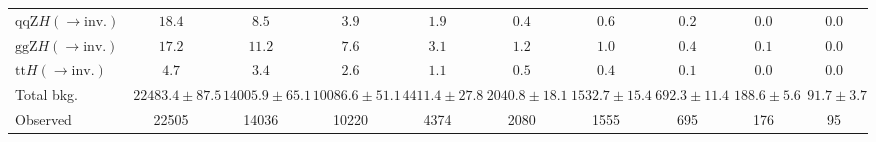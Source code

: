 \begin{tabular}{l|c|c|c|c|c|c|c|c|c}
$\mathrm{qqZ}H(\rightarrow \mathrm{inv.})$  & $18.4 $ & $8.5 $ & $3.9 $ & $1.9 $ & $0.4 $ & $0.6 $ & $0.2 $ & $0.0 $ & $0.0 $\\
$\mathrm{ggZ}H(\rightarrow \mathrm{inv.})$  & $17.2 $ & $11.2 $ & $7.6 $ & $3.1 $ & $1.2 $ & $1.0 $ & $0.4 $ & $0.1 $ & $0.0 $\\
\hline
$\mathrm{tt}H(\rightarrow \mathrm{inv.})$  & $4.7 $ & $3.4 $ & $2.6 $ & $1.1 $ & $0.5 $ & $0.4 $ & $0.1 $ & $0.0 $ & $0.0 $\\
\hline
Total bkg.  & $22483.4\pm87.5$ & $14005.9\pm65.1$ & $10086.6\pm51.1$ & $4411.4\pm27.8$ & $2040.8\pm18.1$ & $1532.7\pm15.4$ & $692.3\pm11.4$ & $188.6\pm5.6$ & $91.7\pm3.7$\\
\hline
Observed & 22505 & 14036 & 10220 & 4374 & 2080 & 1555 & 695 & 176 & 95\\
\hline
\end{tabular}
